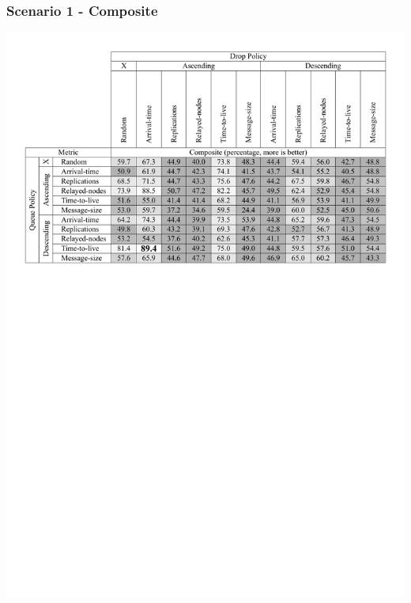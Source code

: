 \begin{frame}
  \frametitle{Scenario 1 - Composite}
  \begin{center}
   \includegraphics[width=1.0\textwidth]{fig/tables/scenario1_part4.pdf}
  \end{center}
\end{frame}




